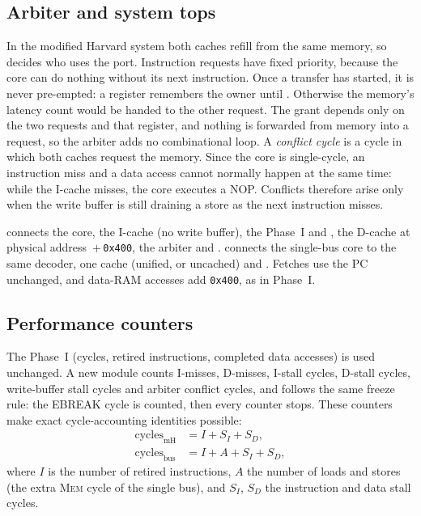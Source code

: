 \subsection{Arbiter and system tops}
In the modified Harvard system both caches refill from the same memory, so  decides
who uses the port. Instruction requests have fixed priority, because the core can do nothing
without its next instruction. Once a transfer has started, it is never pre-empted: a register
remembers the owner until . Otherwise the memory's latency count would be handed to
the other request. The grant depends only on the two requests and that register, and nothing is
forwarded from memory into a request, so the arbiter adds no combinational loop. A
\emph{conflict cycle} is a cycle in which both caches request the memory. Since the core is
single-cycle, an instruction miss and a data access cannot normally happen at the same time:
while the I-cache misses, the core executes a NOP. Conflicts therefore arise only when the write
buffer is still draining a store as the next instruction misses.

 connects the core, the I-cache (no write buffer), the Phase~I 
and , the D-cache at physical address \,$+$\,\texttt{0x400}, the
arbiter and .  connects the single-bus core to the same decoder,
one cache (unified, or uncached) and . Fetches use the PC unchanged, and data-RAM
accesses add \texttt{0x400}, as in Phase~I.

\subsection{Performance counters}
The Phase~I  (cycles, retired instructions, completed data accesses) is
used unchanged. A new  module counts I-misses, D-misses, I-stall cycles,
D-stall cycles, write-buffer stall cycles and arbiter conflict cycles, and follows the same
freeze rule: the EBREAK cycle is counted, then every counter stops. These counters make exact
cycle-accounting identities possible:
\begin{align}
  \text{cycles}_{\text{mH}} &= I + S_I + S_D, \label{eq:mh}\\
  \text{cycles}_{\text{bus}} &= I + A + S_I + S_D, \label{eq:bus}
\end{align}
where $I$ is the number of retired instructions, $A$ the number of loads and stores (the extra
\textsc{Mem} cycle of the single bus), and $S_I$, $S_D$ the instruction and data stall cycles.
